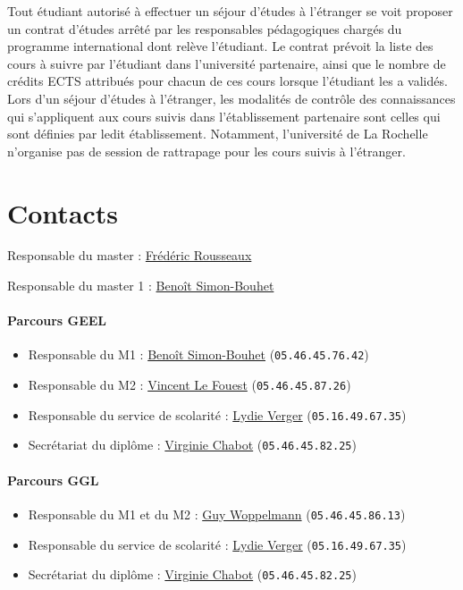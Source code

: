 \documentclass[a4paper,11pt]{article}
\begin{document}
Tout étudiant autorisé à effectuer un séjour d'études à l'étranger se voit proposer un contrat d'études arrêté par les responsables pédagogiques chargés du programme international dont relève l'étudiant. Le contrat prévoit la liste des cours à suivre par l'étudiant dans l'université partenaire, ainsi que le nombre de crédits ECTS attribués pour chacun de ces cours lorsque l'étudiant les a validés.
Lors d'un séjour d'études à l'étranger, les modalités de contrôle des connaissances qui s'appliquent aux cours suivis dans l'établissement partenaire sont celles qui sont définies par ledit établissement. Notamment, l'université de La Rochelle n'organise pas de session de rattrapage pour les cours suivis à l'étranger.

\section{Contacts}\label{Contacts}

Responsable du master : \href{mailto:frederic.rousseaux@univ-lr.fr}{Frédéric Rousseaux}

Responsable du master 1 : \href{mailto:benoit.simon-bouhet@univ-lr.fr}{Benoît Simon-Bouhet}


\paragraph{Parcours GEEL}

\begin{itemize}
	\item Responsable du M1 : \href{mailto:benoit.simon-bouhet@univ-lr.fr}{Benoît Simon-Bouhet} (\texttt{05.46.45.76.42})
	\item Responsable du M2 : \href{mailto:vincent.le_fouest@univ-lr.fr}{Vincent Le Fouest} (\texttt{05.46.45.87.26})
	\item Responsable du service de scolarité : \href{mailto:lydie.verger@univ-lr.fr}{Lydie Verger} (\texttt{05.16.49.67.35})
	\item Secrétariat du diplôme : \href{mailto:virginie.chabot@univ-lr.fr}{Virginie Chabot} (\texttt{05.46.45.82.25})
\end{itemize}

\paragraph{Parcours GGL}

\begin{itemize}
	\item Responsable du M1 et du M2 : \href{mailto:guy.woppelmann@univ-lr.fr}{Guy Woppelmann} (\texttt{05.46.45.86.13})
	\item Responsable du service de scolarité : \href{mailto:lydie.verger@univ-lr.fr}{Lydie Verger} (\texttt{05.16.49.67.35})
	\item Secrétariat du diplôme : \href{mailto:virginie.chabot@univ-lr.fr}{Virginie Chabot} (\texttt{05.46.45.82.25})
\end{itemize}
\end{document}
